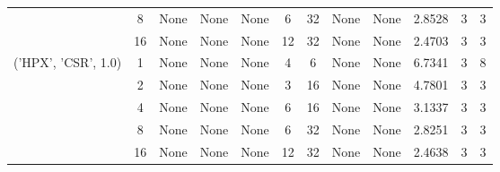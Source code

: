\begin{tabular}{cccccccccccc}
& 8& None& None& None& 6& 32& None& None& 2.8528& 3& 3\\
& 16& None& None& None& 12& 32& None& None& 2.4703& 3& 3\\
\hline
\multirow{5}{*}{('HPX', 'CSR', 1.0)}& 1& None& None& None& 4& 6& None& None& 6.7341& 3& 8\\
& 2& None& None& None& 3& 16& None& None& 4.7801& 3& 3\\
& 4& None& None& None& 6& 16& None& None& 3.1337& 3& 3\\
& 8& None& None& None& 6& 32& None& None& 2.8251& 3& 3\\
& 16& None& None& None& 12& 32& None& None& 2.4638& 3& 3\\
\hline
\end{tabular}
